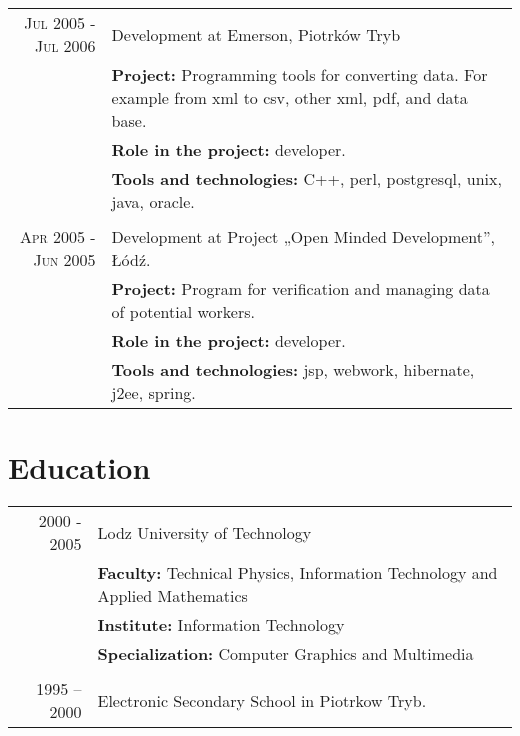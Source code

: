 \documentclass[a4paper,9pt]{article} %
\begin{document}
\begin{longtable}{r|p{11cm}}
\textsc{Jul 2005 - Jul 2006} & Development at Emerson, Piotrków Tryb\\
& \textbf{Project:} Programming tools for converting data. For example from xml to csv, other xml, pdf, and data base.\\
& \textbf{Role in the project:} developer.\\
& \textbf{Tools and technologies:} C++, perl, postgresql, unix, java, oracle.\\
\multicolumn{2}{c}{} \\

\textsc{Apr 2005 - Jun 2005} & Development at Project „Open Minded Development”, Łódź.\\
& \textbf{Project:} Program for verification and managing data of potential workers.\\
& \textbf{Role in the project:} developer.\\
& \textbf{Tools and technologies:} jsp, webwork, hibernate, j2ee, spring.\\

\end{longtable}



\section{Education}

\begin{longtable}{r|l}
\textsc{2000 - 2005} & Lodz University of Technology\\
& \textbf{Faculty:} Technical Physics, Information Technology and Applied Mathematics\\
& \textbf{Institute:} Information Technology\\
& \textbf{Specialization:} Computer Graphics and Multimedia\\
\multicolumn{2}{c}{} \\

\textsc{1995 – 2000} & Electronic Secondary School in Piotrkow Tryb.\\

\end{longtable}


\end{document}
